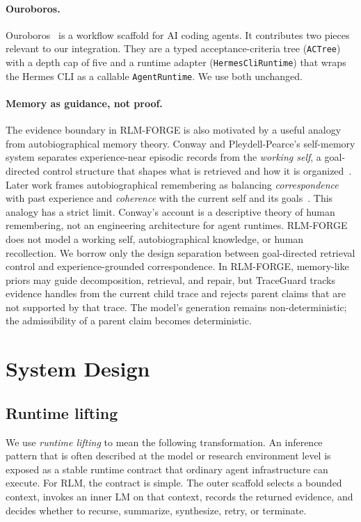 \documentclass[11pt,a4paper]{article}
\begin{document}
\paragraph{Ouroboros.}
Ouroboros~\citep{ouroboros2026} is a workflow scaffold for AI coding
agents. It contributes two pieces relevant to our integration. They are a
typed acceptance-criteria tree (\texttt{ACTree}) with a depth cap of five
and a runtime adapter (\texttt{HermesCliRuntime}) that wraps the Hermes CLI
as a callable \texttt{AgentRuntime}. We use both unchanged.

\paragraph{Memory as guidance, not proof.}
The evidence boundary in RLM-FORGE is also motivated by a useful analogy from
autobiographical memory theory. Conway and Pleydell-Pearce's self-memory
system separates experience-near episodic records from the \emph{working
self}, a goal-directed control structure that shapes what is retrieved and
how it is organized~\citep{conway2000sms}. Later work frames autobiographical
remembering as balancing \emph{correspondence} with past experience and
\emph{coherence} with the current self and its goals~\citep{conway2004correspondence}.
This analogy has a strict limit. Conway's account is a descriptive theory of
human remembering, not an engineering architecture for agent runtimes.
RLM-FORGE does not model a working self, autobiographical knowledge, or human
recollection. We borrow only the design separation between goal-directed
retrieval control and experience-grounded correspondence. In RLM-FORGE,
memory-like priors may guide decomposition, retrieval, and repair, but
TraceGuard tracks evidence handles from the current child trace and rejects
parent claims that are not supported by that trace. The model's generation
remains non-deterministic; the admissibility of a parent claim becomes
deterministic.

\section{System Design}
\label{sec:system}

\subsection{Runtime lifting}
\label{sec:runtime-lifting}

We use \emph{runtime lifting} to mean the following transformation. An
inference pattern that is often described at the model or research
environment level is exposed as a stable runtime contract that ordinary agent
infrastructure can execute. For RLM, the contract is simple. The outer
scaffold selects a bounded context, invokes an inner LM on that context,
records the returned evidence, and decides whether to recurse, summarize,
synthesize, retry, or terminate.
\end{document}
